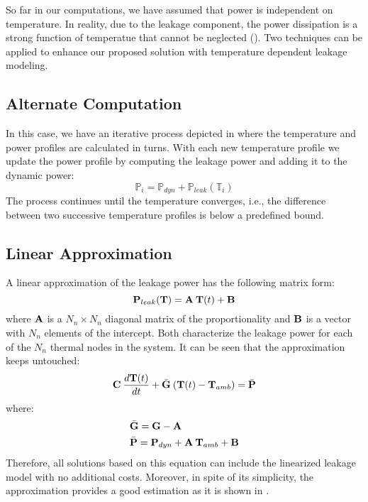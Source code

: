 So far in our computations, we have assumed that power is independent on temperature. In reality, due to the leakage component, the power dissipation is a strong function of temperatue that cannot be neglected (). Two techniques can be applied to enhance our proposed solution with temperature dependent leakage modeling.

\subsection{Alternate Computation}
In this case, we have an iterative process depicted in  where the temperature and power profiles are calculated in turns. With each new temperature profile we update the power profile by computing the leakage power and adding it to the dynamic power:
\[
  \mathbb{P}_i = \mathbb{P}_{dyn} + \mathbb{P}_{leak}(\mathbb{T}_i)
\]
The process continues until the temperature converges, i.e., the difference between two successive temperature profiles is below a predefined bound.

\subsection{Linear Approximation}
A linear approximation of the leakage power has the following matrix form:
\[
  \mathbf{P}_{leak}(\mathbf{T}) = \mathbf{A} \: \mathbf{T}(t) + \mathbf{B}
\]
where $\mathbf{A}$ is a $N_n \times N_n$ diagonal matrix of the proportionality and $\mathbf{B}$ is a vector with $N_n$ elements of the intercept. Both characterize the leakage power for each of the $N_n$ thermal nodes in the system. It can be seen that the approximation keeps  untouched:
\[
  \mathbf{C} \: \frac{d\mathbf{T}(t)}{dt} + \bar{\mathbf{G}} \: (\mathbf{T}(t) - \mathbf{T}_{amb}) = \bar{\mathbf{P}}
\]
where:
\begin{align*}
  & \bar{\mathbf{G}} = \mathbf{G} - \mathbf{A} \\
  & \bar{\mathbf{P}} = \mathbf{P}_{dyn} + \mathbf{A} \: \mathbf{T}_{amb} + \mathbf{B}
\end{align*}
Therefore, all solutions based on this equation can include the linearized leakage model with no additional costs. Moreover, in spite of its simplicity, the approximation provides a good estimation as it is shown in \cite{liu2007}.
